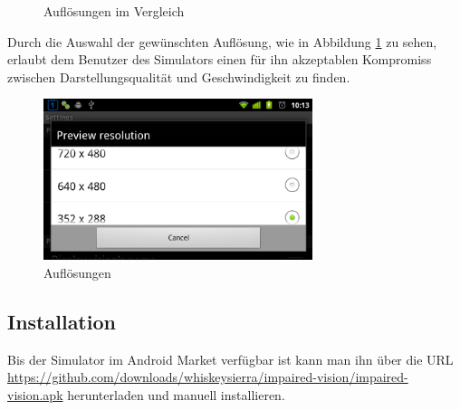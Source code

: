 \documentclass[a4paper]{article}
\begin{document}
\begin{figure}[H]
\centering
{}
\caption{Auflösungen im Vergleich}
\end{figure}

Durch die Auswahl der gewünschten Auflösung, wie in Abbildung \ref{resolutions} zu sehen, erlaubt dem Benutzer des Simulators einen für ihn akzeptablen Kompromiss zwischen Darstellungsqualität und Geschwindigkeit zu finden.

\begin{figure}[H]
\centering
\includegraphics[width=0.7\textwidth, trim=0 0 0 39, clip=true]{resolutions-landscape.png}
\caption{Auflösungen}
\label{resolutions}
\end{figure}

\subsection*{Installation}
Bis der Simulator im Android Market \cite{ANDROID-MARKET} verfügbar ist kann man ihn über die URL \url{https://github.com/downloads/whiskeysierra/impaired-vision/impaired-vision.apk} herunterladen und manuell installieren. 

\newpage

\nocite{ANDROID}
\nocite{GIZMODO}
\nocite{IBFB}
\printbibliography

\listoffigures

\renewcommand\listoflistingscaption{Quellcodeverzeichnis}
\listoflistings
\end{document}
